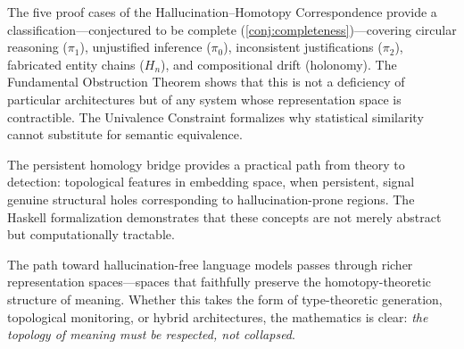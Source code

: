 \documentclass[11pt,a4paper]{article}
\theoremstyle{plain}
\theoremstyle{definition}
\theoremstyle{remark}
\begin{document}
The five proof cases of the Hallucination--Homotopy Correspondence provide a classification---conjectured to be complete (\cref{conj:completeness})---covering circular reasoning ($\pi_1$), unjustified inference ($\pi_0$), inconsistent justifications ($\pi_2$), fabricated entity chains ($H_n$), and compositional drift (holonomy). The Fundamental Obstruction Theorem shows that this is not a deficiency of particular architectures but of any system whose representation space is contractible. The Univalence Constraint formalizes why statistical similarity cannot substitute for semantic equivalence.

The persistent homology bridge provides a practical path from theory to detection: topological features in embedding space, when persistent, signal genuine structural holes corresponding to hallucination-prone regions. The Haskell formalization demonstrates that these concepts are not merely abstract but computationally tractable.

The path toward hallucination-free language models passes through richer representation spaces---spaces that faithfully preserve the homotopy-theoretic structure of meaning. Whether this takes the form of type-theoretic generation, topological monitoring, or hybrid architectures, the mathematics is clear: \emph{the topology of meaning must be respected, not collapsed}.
\end{document}
